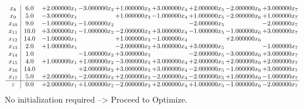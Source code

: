 \documentclass[10pt]{article}
\begin{document}
\[\begin{array}{c| c c@{\hskip 2pt} c@{\hskip 2pt} c@{\hskip 2pt} c@{\hskip 2pt} c@{\hskip 2pt} c@{\hskip 2pt} c@{\hskip 2pt} }
 x_{8}   &  6.0 & + 2.000000 x_{1} & -3.000000 x_{2} & + 1.000000 x_{3} & + 3.000000 x_{4} & + 2.000000 x_{5} & -2.000000 x_{6} & + 3.000000 x_{7}\\
 x_{9}   &  5.0 & -3.000000 x_{1} &   & + 1.000000 x_{3} & -1.000000 x_{4} & + 1.000000 x_{5} & -2.000000 x_{6} & + 1.000000 x_{7}\\
 x_{10}   &  9.0 & -1.000000 x_{1} & -1.000000 x_{2} &    &   & -2.000000 x_{5} &   & -2.000000 x_{7}\\
 x_{11}   &  10.0 & + 3.000000 x_{1} & -1.000000 x_{2} & -2.000000 x_{3} & + 3.000000 x_{4} & -1.000000 x_{5} & -1.000000 x_{6} & + 3.000000 x_{7}\\
 x_{12}   &  14.0 & -1.000000 x_{1} &   & + 1.000000 x_{3} & -1.000000 x_{4} &   & + 2.000000 x_{6} &   \\
 x_{13}   &  2.0 & + 1.000000 x_{1} &   & -2.000000 x_{3} & + 3.000000 x_{4} & + 3.000000 x_{5} &   & -1.000000 x_{7}\\
 x_{14}   &  1.0  &   & -1.000000 x_{2} & + 3.000000 x_{3} &   & -2.000000 x_{5} & -3.000000 x_{6} & + 3.000000 x_{7}\\
 x_{15}   &  4.0 & + 1.000000 x_{1} & + 1.000000 x_{2} & -3.000000 x_{3} & + 3.000000 x_{4} & + 2.000000 x_{5} & + 2.000000 x_{6} & + 2.000000 x_{7}\\
 x_{16}   &  14.0  &   & + 2.000000 x_{2} & + 3.000000 x_{3} & + 3.000000 x_{4} & -2.000000 x_{5} & -1.000000 x_{6} & + 3.000000 x_{7}\\
 x_{17}   &  5.0 & + 2.000000 x_{1} & -2.000000 x_{2} & + 2.000000 x_{3} & -2.000000 x_{4} & -2.000000 x_{5} & + 1.000000 x_{6} & -1.000000 x_{7}\\
\hline
z    &  0.0 & + 2.000000 x_{1} & + 1.000000 x_{2} & -2.000000 x_{3} & + 2.000000 x_{4} & + 1.000000 x_{5} & -1.000000 x_{6} & -2.000000 x_{7}\\
\end{array}\]
No initialization required --> Proceed to Optimize. 
\end{document}

